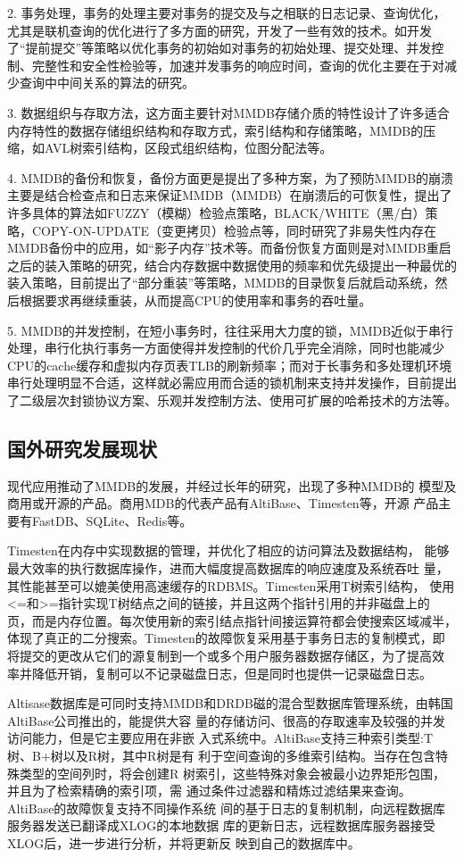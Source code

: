 \documentclass[proposal]{zjutreport}
\begin{document}
2. 事务处理，事务的处理主要对事务的提交及与之相联的日志记录、查询优化，尤其是联机查询的优化进行了多方面的研究，开发了一些有效的技术。如开发了“提前提交”等策略以优化事务的初始如对事务的初始处理、提交处理、并发控制、完整性和安全性检验等，加速并发事务的响应时间，查询的优化主要在于对减少查询中中间关系的算法的研究。

3. 数据组织与存取方法，这方面主要针对MMDB存储介质的特性设计了许多适合内存特性的数据存储组织结构和存取方式，索引结构和存储策略，MMDB的压缩，如AVL树索引结构，区段式组织结构，位图分配法等。

4. MMDB的备份和恢复，备份方面更是提出了多种方案，为了预防MMDB的崩溃主要是结合检查点和日志来保证MMDB（MMDB）在崩溃后的可恢复性，提出了许多具体的算法如FUZZY（模糊）检验点策略，BLACK/WHITE（黑/白）策略，COPY-ON-UPDATE（变更拷贝）检验点等，同时研究了非易失性内存在MMDB备份中的应用，如“影子内存”技术等。而备份恢复方面则是对MMDB重启之后的装入策略的研究，结合内存数据中数据使用的频率和优先级提出一种最优的装入策略，目前提出了“部分重装”等策略，MMDB的目录恢复后就启动系统，然后根据要求再继续重装，从而提高CPU的使用率和事务的吞吐量。

5. MMDB的并发控制，在短小事务时，往往采用大力度的锁，MMDB近似于串行处理，串行化执行事务一方面使得并发控制的代价几乎完全消除，同时也能减少CPU的cache缓存和虚拟内存页表TLB的刷新频率；而对于长事务和多处理机环境串行处理明显不合适，这样就必需应用而合适的锁机制来支持并发操作，目前提出了二级层次封锁协议方案、乐观并发控制方法、使用可扩展的哈希技术的方法等。

\subsection{国外研究发展现状}
现代应用推动了MMDB的发展，并经过长年的研究，出现了多种MMDB的
模型及商用或开源的产品。商用MDB的代表产品有AltiBase、Timesten等，开源
产品主要有FastDB、SQLite、Redis等。

Timesten在内存中实现数据的管理，并优化了相应的访问算法及数据结构，
能够最大效率的执行数据库操作，进而大幅度提高数据库的响应速度及系统吞吐
量，其性能甚至可以媲美使用高速缓存的RDBMS。Timesten采用T树索引结构，
使用<=和>=指针实现T树结点之间的链接，并且这两个指针引用的并非磁盘上的
页，而是内存位置。每次使用新的索引结点指针间接运算符都会使搜索区域减半，
体现了真正的二分搜索。Timesten的故障恢复采用基于事务日志的复制模式，即
将提交的更改从它们的源复制到一个或多个用户服务器数据存储区，为了提高效
率并降低开销，复制可以不记录磁盘日志，但是同时也提供一记录磁盘日志。

Altisase数据库是可同时支持MMDB和DRDB磁的混合型数据库管理系统，由韩国AltiBase公司推出的，能提供大容
量的存储访问、很高的存取速率及较强的并发访问能力，但是它主要应用在非嵌
入式系统中。AltiBase支持三种索引类型:T树、B+树以及R树，其中R树是有
利于空间查询的多维索引结构。当存在包含特殊类型的空间列时，将会创建R
树索引，这些特殊对象会被最小边界矩形包围，并且为了检索精确的索引项，需
通过条件过滤器和精炼过滤结果来查询。AltiBase的故障恢复支持不同操作系统
间的基于日志的复制机制，向远程数据库服务器发送已翻译成XLOG的本地数据
库的更新日志，远程数据库服务器接受XLOG后，进一步进行分析，并将更新反
映到自己的数据库中。
\end{document}
